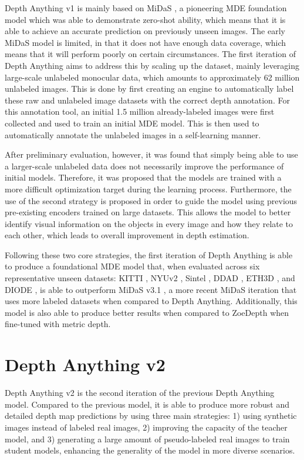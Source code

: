 Depth Anything v1 is mainly based on MiDaS \parencite{Midas}, a pioneering MDE foundation model which was able to demonstrate zero-shot ability, which means that it is able to achieve an accurate prediction on previously unseen images. The early MiDaS model is limited, in that it does not have enough data coverage, which means that it will perform poorly on certain circumstances. The first iteration of Depth Anything aims to address this by scaling up the dataset, mainly leveraging large-scale unlabeled monocular data, which amounts to approximately 62 million unlabeled images. This is done by first creating an engine to automatically label these raw and unlabeled image datasets with the correct depth annotation. For this annotation tool, an initial 1.5 million already-labeled images were first collected and used to train an initial MDE model. This is then used to automatically annotate the unlabeled images in a self-learning manner.

After preliminary evaluation, however, it was found that simply being able to use a larger-scale unlabeled data does not necessarily improve the performance of initial models. Therefore, it was proposed that the models are trained with a more difficult optimization target during the learning process. Furthermore, the use of the second strategy is proposed in order to guide the model using previous pre-existing encoders trained on large datasets. This allows the model to better identify visual information on the objects in every image and how they relate to each other, which leads to overall improvement in depth estimation.

Following these two core strategies, the first iteration of Depth Anything is able to produce a foundational MDE model that, when evaluated across six representative unseen datasets: KITTI \parencite{kitti}, NYUv2 \parencite{NYUv2}, Sintel \parencite{Sintel}, DDAD \parencite{ddad}, ETH3D \parencite{eth3d}, and DIODE \parencite{diode}, is able to outperform MiDaS v3.1 \parencite{midas31}, a more recent MiDaS iteration that uses more labeled datasets when compared to Depth Anything. Additionally, this model is also able to produce better results when compared to ZoeDepth when fine-tuned with metric depth.

\section{Depth Anything v2}

Depth Anything v2 \parencite{DepthAnythingV2} is the second iteration of the previous Depth Anything model. Compared to the previous model, it is able to produce more robust and detailed depth map predictions by using three main strategies: 1) using synthetic images instead of labeled real images, 2) improving the capacity of the teacher model, and 3) generating a large amount of pseudo-labeled real images to train student models, enhancing the generality of the model in more diverse scenarios.

